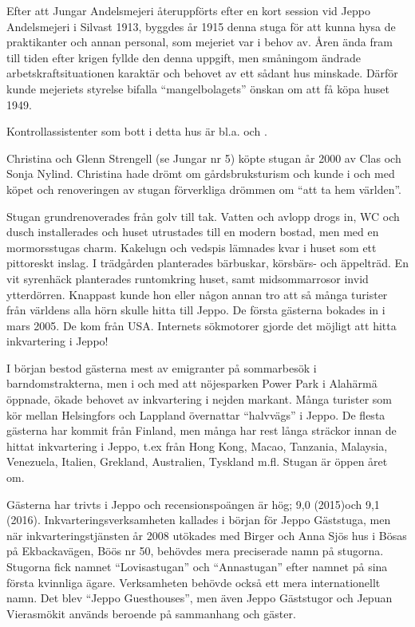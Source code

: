 Efter att Jungar Andelsmejeri återuppförts efter en kort session vid Jeppo Andelsmejeri i Silvast 1913, byggdes år 1915 denna stuga för att kunna hysa de praktikanter och annan personal, som mejeriet var i behov av. Åren ända fram till tiden efter krigen fyllde den denna uppgift, men småningom ändrade arbetskraftsituationen karaktär och behovet av ett sådant hus minskade. Därför kunde mejeriets styrelse bifalla ``mangelbolagets'' önskan om att få köpa huset 1949.

Kontrollassistenter som bott i detta hus är bl.a.  och .





Christina och Glenn Strengell (se Jungar nr 5) köpte stugan år 2000 av Clas och Sonja Nylind. Christina hade drömt om gårdsbruksturism och kunde i och med köpet och renoveringen av stugan förverkliga drömmen om ``att ta hem världen''.

Stugan grundrenoverades från golv till tak. Vatten och avlopp drogs in, WC och dusch installerades och huset utrustades till en modern bostad, men med en mormorsstugas charm. Kakelugn och vedspis lämnades kvar i huset som ett pittoreskt inslag. I trädgården planterades bärbuskar, körsbärs- och äppelträd. En vit syrenhäck planterades runtomkring huset, samt midsommarrosor invid ytterdörren. Knappast kunde hon eller någon annan tro att så många turister från världens alla hörn skulle hitta till Jeppo. De första gästerna bokades in i mars 2005. De kom från USA. Internets sökmotorer gjorde det möjligt att hitta inkvartering i Jeppo!

I början bestod gästerna mest av emigranter på sommarbesök i barndomstrakterna, men i och med att nöjesparken Power Park i Alahärmä öppnade, ökade behovet av inkvartering i nejden markant. Många turister som kör mellan Helsingfors och Lappland övernattar ``halvvägs'' i Jeppo. De flesta gästerna har kommit från Finland, men många har rest långa sträckor innan de hittat inkvartering i Jeppo, t.ex från Hong Kong, Macao, Tanzania, Malaysia, Venezuela, Italien, Grekland, Australien, Tyskland m.fl. Stugan är öppen året om.

Gästerna har trivts i Jeppo och recensionspoängen är hög; 9,0 (2015)och 9,1 (2016). Inkvarteringsverksamheten kallades i början för Jeppo Gäststuga, men när inkvarteringstjänsten år 2008 utökades med Birger och Anna Sjös hus i Bösas på Ekbackavägen, Böös nr 50, behövdes mera preciserade namn på stugorna. Stugorna fick namnet ``Lovisastugan'' och ``Annastugan'' efter namnet på sina första kvinnliga ägare. Verksamheten behövde också ett mera internationellt namn. Det blev ``Jeppo Guesthouses'', men även Jeppo Gäststugor och Jepuan Vierasmökit används beroende på sammanhang och gäster.


